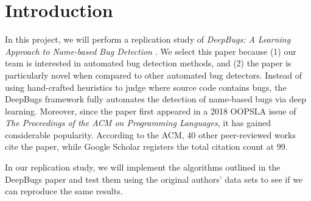 \section{Introduction}

In this project, we will perform a replication study of \textit{DeepBugs: A Learning Approach to Name-based Bug Detection} \cite{pradel_deepbugs_2018}. We select this paper because (1) our team is interested in automated bug detection methods, and (2) the paper is particularly novel when compared to other automated bug detectors. Instead of using hand-crafted heuristics to judge where source code contains bugs, the DeepBugs framework fully automates the detection of name-based bugs via deep learning. Moreover, since the paper first appeared in a 2018 OOPSLA issue of \textit{The Proceedings of the ACM on Programming Languages}, it has gained considerable popularity. According to the ACM, 40 other peer-reviewed works cite the paper, while Google Scholar registers the total citation count at 99.

In our replication study, we will implement the algorithms outlined in the DeepBugs paper and test them using the original authors' data sets to see if we can reproduce the same results. 


